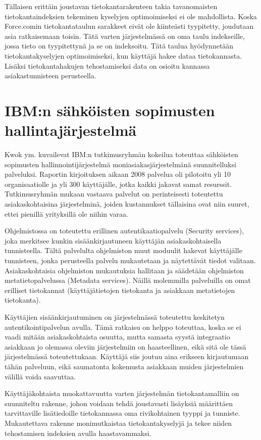 Tällaisen erittäin joustavan tietokantarakenteen takia tavanomaisten tietokantaindeksien tekeminen kyselyjen optimoimiseksi ei ole mahdollista. Koska Force.comin tietokantataulun sarakkeet eivät ole kiinteästi tyypitetty, joudutaan asia ratkaisemaan toisin. Tätä varten järjestelmässä on oma taulu indekseille, jossa tieto on tyypitettynä ja se on indeksoitu. Tätä taulua hyödynnetään tietokantakyselyjen optimoimiseksi, kun käyttäjä hakee dataa tietokannasta. Lisäksi tietokantahakujen tehostamiseksi data on osioitu kannassa asiakastunnisteen perusteella.



\section{IBM:n sähköisten sopimusten hallintajärjestelmä}
Kwok ym. \cite{kwok2008software} kuvailevat IBM:n tutkimusryhmän kokeilua toteuttaa sähköisten sopimusten hallinnointijärjestelmä moniasiakasjärjestelmänä suunnitelluksi palveluksi. Raportin kirjoituksen aikaan 2008 palvelua oli pilotoitu yli 10 organisaatiolle ja yli 300 käyttäjälle, jotka kaikki jakavat samat resurssit. Tutkimusryhmän mukaan vastaava palvelut on perinteisesti toteutettu asiakaskohtaisina järjestelminä, joiden kustannukset tällaisina ovat niin suuret, ettei pienillä yrityksillä ole niihin varaa.

Ohjelmistossa on toteutettu erillinen autentikaatiopalvelu (Security services), joka merkitsee kunkin sisäänkirjautuneen käyttäjän asiakaskohtaisella tunnisteella. Tältä palvelulta ohjelmiston muut moduulit hakevat käyttäjälle tunnisteen, jonka perusteella palvelu mukautetaan ja näytettävät tiedot valitaan. Asiakaskohtaisia ohjelmiston mukautuksia hallitaan ja säädetään ohjelmiston metatietopalvelussa (Metadata services). Näillä molemmilla palveluilla on omat erilliset tietokannat (käyttäjätietojen tietokanta ja asiakkaan metatietojen tietokanta).

Käyttäjien sisäänkirjautuminen on järjestelmässä toteutettu keskitetyn autentikointipalvelun avulla. Tämä ratkaisu on helppo toteuttaa, koska se ei vaadi mitään asiakaskohtaista osuutta, mutta samasta syystä integraatio asiakkaan jo olemassa oleviin järjestelmiin on haasteellinen, eikä sitä ole tässä järjestelmässä toteutettukaan. Käyttäjä siis joutuu aina erikseen kirjautumaan tähän palveluun, eikä saumatonta kokemusta asiakkaan muiden järjestelmien välillä voida saavuttaa.

Käyttäjäkohtaista muokattavuutta varten järjestelmän tietokantamalliin on suunniteltu rakenne, johon voidaan tehdä joustavasti lisäyksiä määrittäen tarvittaville lisätiedoille tietokannassa oma rivikohtainen tyyppi ja tunniste. Mukautettava rakenne monimutkaistaa tietokantakyselyjä ja tekee niiden tehostamisen indeksien avulla haastavammaksi.

